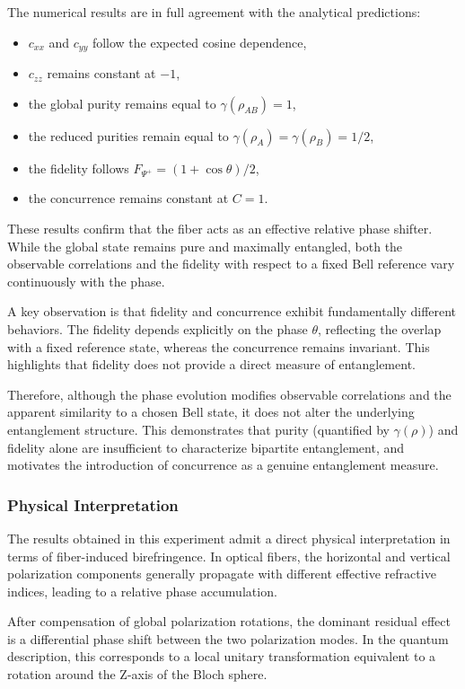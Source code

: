 \documentclass[a4paper]{article}
\begin{document}
The numerical results are in full agreement with the analytical predictions:
\begin{itemize}
    \item \(c_{xx}\) and \(c_{yy}\) follow the expected cosine dependence,
    \item \(c_{zz}\) remains constant at \(-1\),
    \item the global purity remains equal to \(\gamma(\rho_{AB})=1\),
    \item the reduced purities remain equal to \(\gamma(\rho_A)=\gamma(\rho_B)=1/2\),
    \item the fidelity follows \(F_{\Psi^+}=(1+\cos\theta)/2\),
    \item the concurrence remains constant at \(C=1\).
\end{itemize}

These results confirm that the fiber acts as an effective relative phase shifter. While the global state remains pure and maximally entangled, both the observable correlations and the fidelity with respect to a fixed Bell reference vary continuously with the phase.

A key observation is that fidelity and concurrence exhibit fundamentally different behaviors. The fidelity depends explicitly on the phase \(\theta\), reflecting the overlap with a fixed reference state, whereas the concurrence remains invariant. This highlights that fidelity does not provide a direct measure of entanglement.

Therefore, although the phase evolution modifies observable correlations and the apparent similarity to a chosen Bell state, it does not alter the underlying entanglement structure. This demonstrates that purity (quantified by \(\gamma(\rho)\)) and fidelity alone are insufficient to characterize bipartite entanglement, and motivates the introduction of concurrence as a genuine entanglement measure.

\subsubsection{Physical Interpretation}

The results obtained in this experiment admit a direct physical interpretation in terms of fiber-induced birefringence. In optical fibers, the horizontal and vertical polarization components generally propagate with different effective refractive indices, leading to a relative phase accumulation.

After compensation of global polarization rotations, the dominant residual effect is a differential phase shift between the two polarization modes. In the quantum description, this corresponds to a local unitary transformation equivalent to a rotation around the Z-axis of the Bloch sphere.
\end{document}
